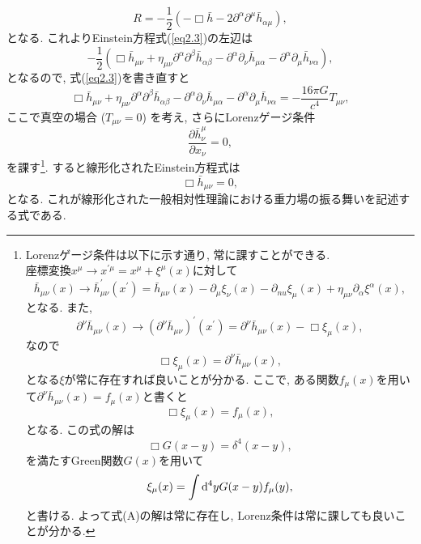 \begin{equation}
R=-\frac{1}{2}\left(-\Box\bar{h}-2\partial^{\alpha}\partial^{\mu}\bar{h}_{\alpha\mu}\right),
\end{equation}
となる. これよりEinstein方程式(\ref{eq2.3})の左辺は
\begin{equation}
-\frac{1}{2}\left(\Box\bar{h}_{\mu\nu}+\eta_{\mu\nu}\partial^{\alpha}\partial^{\beta}\bar{h}_{\alpha\beta}-\partial^{\alpha}\partial_{\nu}\bar{h}_{\mu\alpha}-\partial^{\alpha}\partial_{\mu}\bar{h}_{\nu\alpha}\right),
\end{equation}
となるので, 式(\ref{eq2.3})を書き直すと
\begin{equation}
\Box\bar{h}_{\mu\nu}+\eta_{\mu\nu}\partial^{\alpha}\partial^{\beta}\bar{h}_{\alpha\beta}-\partial^{\alpha}\partial_{\nu}\bar{h}_{\mu\alpha}-\partial^{\alpha}\partial_{\mu}\bar{h}_{\nu\alpha}=-\frac{16\pi G}{c^4}T_{\mu\nu},
\end{equation}
ここで真空の場合 ($T_{\mu\nu}=0$) を考え, さらにLorenzゲージ条件
\begin{equation}
\frac{\partial \bar{h}^{\mu}_{\nu}}{\partial x_{\nu}}=0,
\label{eq2.17}
\end{equation}
を課す\footnote{Lorenzゲージ条件は以下に示す通り, 常に課すことができる. \\座標変換$x^{\mu}\rightarrow x^{\prime\mu}=x^{\mu}+\xi^{\mu}(x)$に対して
\begin{equation*}
\bar{h}_{\mu\nu}(x)\rightarrow\bar{h}^{\prime}_{\mu\nu}(x^{\prime})=\bar{h}_{\mu\nu}(x)-\partial_{\mu}\xi_{\nu}(x)-\partial_{nu}\xi_{\mu}(x)+\eta_{\mu\nu}\partial_{\alpha}\xi^{\alpha}(x),
\end{equation*}
となる. また, 
\begin{equation*}
\partial^{\nu}\bar{h}_{\mu\nu}(x)\rightarrow(\partial^{\nu}\bar{h}_{\mu\nu})^{\prime}(x^{\prime})=\partial^{\nu}\bar{h}_{\mu\nu}(x)-\Box\xi_{\mu}(x),
\end{equation*}
なので
\begin{equation*}
\Box\xi_{\mu}(x)=\partial^{\nu}\bar{h}_{\mu\nu}(x),
\tag{A}
\end{equation*}
となる$\xi$が常に存在すれば良いことが分かる. ここで, ある関数$f_{\mu}(x)$を用いて$\partial^{\nu}\bar{h}_{\mu\nu}(x)=f_{\mu}(x)$と書くと
\begin{equation*}
\Box\xi_{\mu}(x)=f_{\mu}(x),
\end{equation*}
となる. この式の解は
\begin{equation*}
\Box G(x-y)=\delta^{4}(x-y),
\end{equation*}
を満たすGreen関数$G(x)$を用いて
\begin{equation*}
\xi_{\mu}(x)=\int{\rm d}^4yG(x-y)f_{\mu}(y),
\end{equation*}
と書ける. よって式(A)の解は常に存在し, Lorenz条件は常に課しても良いことが分かる. 
}. すると線形化されたEinstein方程式は
\begin{equation}
\Box\bar{h}_{\mu\nu}=0,
\label{eq2.18}
\end{equation}
となる. これが線形化された一般相対性理論における重力場の振る舞いを記述する式である. \\
